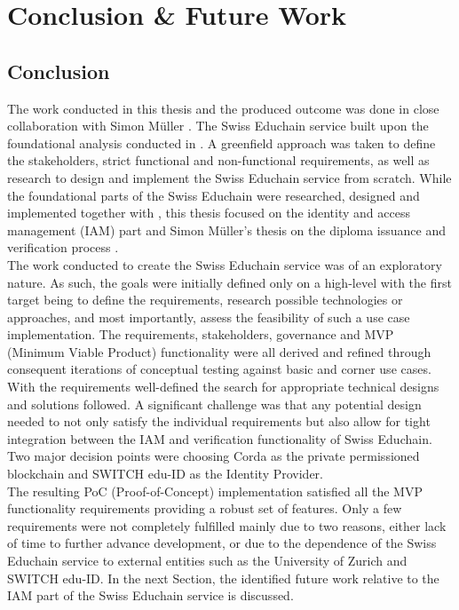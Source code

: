 \chapter{Conclusion \& Future Work}

\section{Conclusion} \label{sec:conclusion}

The work conducted in this thesis and the produced outcome was done in close collaboration with Simon M{\"u}ller \cite{mueller20}. The Swiss Educhain service built upon the foundational analysis conducted in \cite{Gres18}. A greenfield approach was taken to define the stakeholders, strict functional and non-functional requirements, as well as research to design and implement the Swiss Educhain service from scratch. While the foundational parts of the Swiss Educhain were researched, designed and implemented together with \cite{mueller20}, this thesis focused on the identity and access management (IAM) part and Simon M{\"u}ller's thesis on the diploma issuance and verification process \cite{mueller20}. \\
The work conducted to create the Swiss Educhain service was of an exploratory nature. As such, the goals were initially defined only on a high-level with the first target being to define the requirements, research possible technologies or approaches, and most importantly, assess the feasibility of such a use case implementation. The requirements, stakeholders, governance and MVP (Minimum Viable Product) functionality were all derived and refined through consequent iterations of conceptual testing against basic and corner use cases. \\
With the requirements well-defined the search for appropriate technical designs and solutions followed. A significant challenge was that any potential design needed to not only satisfy the individual requirements but also allow for tight integration between the IAM and verification functionality of Swiss Educhain. Two major decision points were choosing Corda as the private permissioned blockchain and SWITCH edu-ID as the Identity Provider. \\
The resulting PoC (Proof-of-Concept) implementation satisfied all the MVP functionality requirements providing a robust set of features. Only a few requirements were not completely fulfilled mainly due to two reasons, either lack of time to further advance development, or due to the dependence of the Swiss Educhain service to external entities such as the University of Zurich and SWITCH edu-ID. In the next Section, the identified future work relative to the IAM part of the Swiss Educhain service is discussed.

